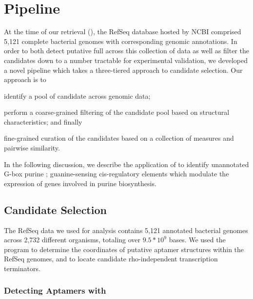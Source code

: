 \section{Pipeline} \label{sec:pipeline}

At the time of our retrieval (\fnaRetrievalTime), the RefSeq database hosted by NCBI comprised 5,121 complete bacterial genomes with corresponding genomic annotations. In order to both detect putative full \rbs across this collection of data as well as filter the candidates down to a number tractable for experimental validation, we developed a novel pipeline which takes a three-tiered approach to candidate selection. Our approach is to \begin{inparaenum}
\item identify a pool of candidate \rbs across genomic data;
\item perform a coarse-grained filtering of the candidate pool based on structural characteristics; and finally
\item fine-grained curation of the candidates based on a collection of measures and pairwise similarity.
\end{inparaenum}

In the following discussion, we describe the application of \rfinder to identify unannotated G-box purine \rbs; guanine-sensing cis-regulatory elements which modulate the expression of genes involved in purine biosynthesis.

\subsection{Candidate Selection} \label{sub:candidates}

The RefSeq data we used for analysis contains 5,121 annotated bacterial genomes across 2,732 different organisms, totaling over $9.5 * 10^9$ bases. We used the program \infernal to determine the coordinates of putative aptamer structures within the RefSeq genomes, and \tthp to locate candidate rho-independent transcription terminators.

\subsubsection{Detecting Aptamers with \infernal} \label{ssub:infernal}

